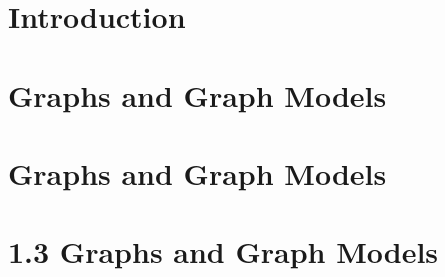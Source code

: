 \section{Introduction}

\section*{Graphs and Graph Models}
\section{Graphs and Graph Models}
\section*{1.3 Graphs and Graph Models}